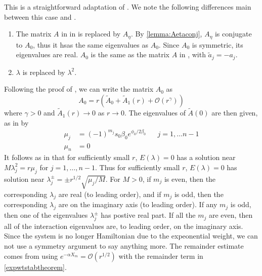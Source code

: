 \documentclass[thesis.tex]{subfiles}
\begin{document}
This is a straightforward adaptation of \cite[Theorem 3(iv)]{Sandstede1998}. We note the following differences main between this case and \cite{Sandstede1998}.
\begin{enumerate}
	\item The matrix $A$ in \cite{Sandstede1998} in is replaced by $A_\eta$. By \cref{lemma:Aetaconj}, $A_\eta$ is conjugate to $A_0$, thus it hsas the same eigenvalues as $A_0$. Since $A_0$ is symmetric, its eigenvalues are real. $A_0$ is the same as the matrix $A$ in \cite[Theorem 2]{Sandstede1998}, with $\tilde{a}_j = -a_j$.
	\item $\lambda$ is replaced by $\lambda^2$.
\end{enumerate}

Following the proof of \cite[Theorem 3]{Sandstede1998}, we can write the matrix $A_0$ as
\[
A_0 = r\left( \tilde{A}_0 + \tilde{A}_1(r) + \mathcal{O}(r^\gamma)\right)
\]
where $\gamma > 0$ and $\tilde{A}_1(r) \rightarrow 0$ as $r \rightarrow 0$. The eigenvalues of $\tilde{A}(0)$ are then given, as in \cite[p.462]{Sandstede1998}  by
\begin{align*}
\mu_j &= (-1)^{m_j} s_0 \beta_0 e^{\phi_0/2 \beta_0} && j = 1, \dots n-1 \\
\mu_n &= 0
\end{align*}
It follows as in \cite{Sandstede1998} that for sufficiently small $r$, $E(\lambda) = 0$ has a solution near $M \lambda_j^2 = r \mu_j$ for $j = 1, \dots, n-1$. Thus for sufficiently small $r$, $E(\lambda) = 0$ has solution near $\lambda_j^\pm = \pm r^{1/2} \sqrt{\mu_j/M}$. For $M > 0$, if $m_j$ is even, then the corresponding $\lambda_j$ are real (to leading order), and if $m_j$ is odd, then the corresponding $\lambda_j$ are on the imaginary axis (to leading order). If any $m_j$ is odd, then one of the eigenvalues $\lambda_j^\pm$ has postive real part. If all the $m_j$ are even, then all of the interaction eigenvalues are, to leading order, on the imaginary axis. Since the system is no longer Hamiltonian due to the expeonential weight, we can not use a symmetry argument to say anything more. The remainder estimate comes from using $e^{-\alpha X_m} = \mathcal{O}(r^{1/2})$ with the remainder term in \cref{expwtstabtheorem}.

\iffulldocument\else
	
	
\fi
\end{document}
